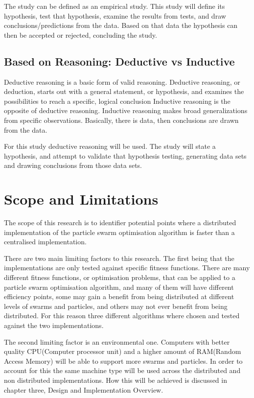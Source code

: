 \documentclass[oneside,12pt]{book}
\begin{document}
The study can be defined as an empirical study. This study will define its hypothesis, test that hypothesis, examine the results from tests, and draw conclusions/predictions from the data. Based on that data the hypothesis can then be accepted or rejected, concluding the study.  

\subsection{Based on Reasoning: Deductive vs Inductive}
Deductive reasoning is a basic form of valid reasoning. Deductive reasoning, or deduction, starts out with a general statement, or hypothesis, and examines the possibilities to reach a specific, logical conclusion
Inductive reasoning is the opposite of deductive reasoning. Inductive reasoning makes broad generalizations from specific observations. Basically, there is data, then conclusions are drawn from the data. 

For this study deductive reasoning will be used. The study will state a hypothesis, and attempt to validate that hypothesis testing, generating data sets and drawing conclusions from those data sets. 

\section{Scope and Limitations}
The scope of this research is to identifier potential points where a distributed implementation of the particle swarm optimisation algorithm is faster than a centralised implementation. 

There are two main limiting factors to this research. The first being that the implementations are only tested against specific fitness functions. There are many different fitness functions, or optimisation problems, that can be applied to a particle swarm optimisation algorithm, and many of them will have different efficiency points, some may gain a benefit from being distributed at different levels of swarms and particles, and others may not ever benefit from being distributed. For this reason three different algorithms where chosen and tested against the two implementations. 

The second limiting factor is an environmental one. Computers with better quality CPU(Computer processor unit) and a higher amount of RAM(Random Access Memory) will be able to support more swarms and particles. In order to account for this the same machine type will be used across the distributed and non distributed implementations. How this will be achieved is discussed in chapter three, Design and Implementation Overview. 
\end{document}
